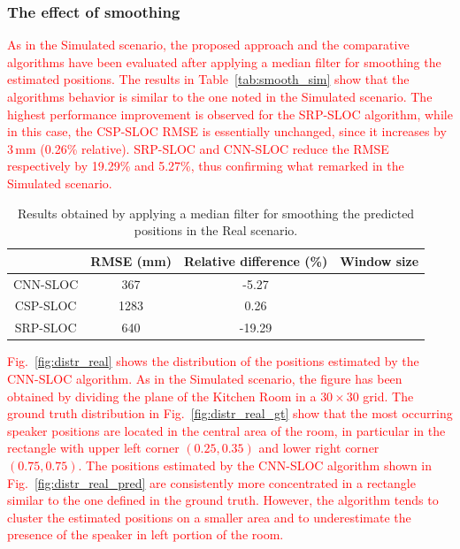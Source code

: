 \documentclass[review]{elsarticle}
\newcommand{\figref}[1]{Fig.~\ref{#1}}
\newcommand{\tableref}[1]{Table~\ref{#1}}
\begin{document}
\subsubsection{The effect of smoothing}
\textcolor{red}{
As in the Simulated scenario, the proposed approach and the comparative algorithms have been evaluated after applying a median filter for smoothing the estimated positions. The results in \tableref{tab:smooth_sim} show that the algorithms behavior is similar to the one noted in the Simulated scenario. The highest performance improvement is observed for the SRP-SLOC algorithm, while in this case, the CSP-SLOC RMSE is essentially unchanged, since it increases by 3\,mm (0.26\% relative). SRP-SLOC and CNN-SLOC reduce the RMSE respectively by 19.29\% and 5.27\%, thus confirming what remarked in the Simulated scenario.
}

\begin{table}[t]
\centering
\caption{Results obtained by applying a median filter for smoothing the predicted positions in the Real scenario.}\label{tab:smooth_real}
\begin{tabular}{c | c | c | c}
  	 				& RMSE (mm) & Relative difference (\%) & Window size \\
\hline
CNN-SLOC    & 367 & -5.27 &\\
CSP-SLOC    & 1283 & 0.26 &\\
SRP-SLOC    & 640 & -19.29 &\\
\end{tabular}
\end{table}

\textcolor{red}{
\figref{fig:distr_real} shows the distribution of the positions estimated by the CNN-SLOC algorithm. As in the Simulated scenario, the figure has been obtained by dividing the plane of the Kitchen Room in a $30 \times 30$ grid. The ground truth distribution in \figref{fig:distr_real_gt} show that the most occurring speaker positions are located in the central area of the room, in particular in the rectangle with upper left corner $(0.25, 0.35)$ and lower right corner $(0.75, 0.75)$. The positions estimated by the CNN-SLOC algorithm shown in \figref{fig:distr_real_pred} are consistently more concentrated in a rectangle similar to the one defined in the ground truth. However, the algorithm tends to cluster the estimated positions on a smaller area and to underestimate the presence of the speaker in left portion of the room.
}
\end{document}
